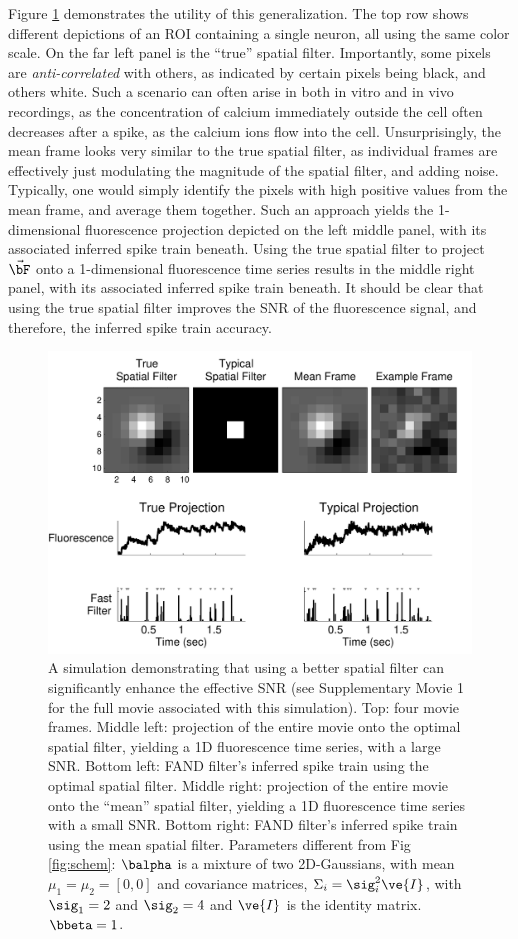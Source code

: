 Figure \ref{fig:spatial} demonstrates the utility of this generalization.  The top row shows different depictions of an ROI containing a single neuron, all using the same color scale.  On the far left panel is the ``true'' spatial filter.  Importantly, some pixels are \emph{anti-correlated} with others, as indicated by certain pixels being black, and others white.  Such a scenario can often arise in both in vitro and in vivo recordings, as the concentration of calcium immediately outside the cell often decreases after a spike, as the calcium ions flow into the cell.  Unsurprisingly, the mean frame looks very similar to the true spatial filter, as individual frames are effectively just modulating the magnitude of the spatial filter, and adding noise.  Typically, one would simply identify the pixels with high positive values from the mean frame, and average them together.  Such an approach yields the 1-dimensional fluorescence projection depicted on the left middle panel, with its associated inferred spike train beneath.  Using the true spatial filter to project $\vec{\bF}$ onto a 1-dimensional fluorescence time series results in the middle right panel, with its associated inferred spike train beneath.  It should be clear that using the true spatial filter improves the SNR of the fluorescence signal, and therefore, the inferred spike train accuracy.

\begin{figure}[H]
\centering \includegraphics[width=.9\linewidth]{../figs/spatial}
\caption{A simulation demonstrating that using a better spatial filter can significantly enhance the effective SNR (see Supplementary Movie 1 for the full movie associated with this simulation).  Top: four movie frames.  Middle left: projection of the entire movie onto the optimal spatial filter, yielding a 1D fluorescence time series, with a large SNR. Bottom left: FAND filter's inferred spike train using the optimal spatial filter.  Middle right: projection of the entire movie onto the ``mean'' spatial filter, yielding a 1D fluorescence time series with a small SNR. Bottom right: FAND filter's inferred spike train using the mean spatial filter. Parameters different from Fig \ref{fig:schem}: $\balpha$ is a mixture of two 2D-Gaussians, with mean $\mu_1=\mu_2=[0, 0]$ and covariance matrices, $\Sigma_i=\sig_i^2 \ve{I}$, with $\sig_1=2$ and $\sig_2=4$ and $\ve{I}$ is the identity matrix. $\bbeta=1$.} \label{fig:spatial} \end{figure} 